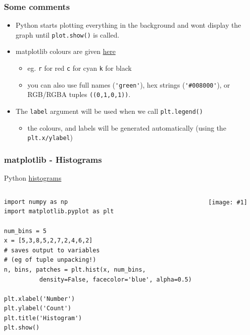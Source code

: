 \documentclass[xcolor=svgnames, handout]{beamer}
\newcommand{\nl}{\\[1em]}
\newcommand{\ipic}[2]{\texttt{[image: \#1]}}
\newcommand{\ft}[1]{\frametitle{#1}}
\begin{document}
\begin{frame}[fragile]\ft{Some comments}
\begin{itemize}
\item Python starts plotting everything in the background and wont display the graph until {\tt plot.show()} is called.\nl

\item matplotlib colours are given  \href{https://matplotlib.org/2.1.1/api/_as_gen/matplotlib.pyplot.plot.html}{here}
\vspace{-.3em}
\begin{itemize}
\item eg. {\tt r} for red {\tt c} for cyan {\tt k} for black
\item you can also use full names (\verb|'green'|), hex strings (\verb|'#008000'|), or RGB/RGBA tuples \verb|((0,1,0,1))|.\nl%
\end{itemize}
\item The {\tt label} argument will be used when we call {\tt plt.legend()}
\begin{itemize}
\item the colours, and labels will be generated automatically (using the {\tt plt.x/ylabel})
\end{itemize}

\end{itemize}

\end{frame}






\begin{frame}[fragile]\ft{matplotlib - Histograms }
Python \href{https://matplotlib.org/3.1.0/api/_as_gen/matplotlib.pyplot.hist.html}{histograms}
\begin{columns}[T] %
\begin{column}{.50\textwidth}
\begin{Verbatim}[xleftmargin=.1in] 
import numpy as np
import matplotlib.pyplot as plt

num_bins = 5
x = [5,3,8,5,2,7,2,4,6,2]
# saves output to variables
# (eg of tuple unpacking!)
n, bins, patches = plt.hist(x, num_bins, 
          density=False, facecolor='blue', alpha=0.5)

plt.xlabel('Number')
plt.ylabel('Count')
plt.title('Histogram')
plt.show()
\end{Verbatim}
\end{column}%
\hfill%
\begin{column}{.46\textwidth}
\ipic{hist}{0.9}
\end{column}%
\end{columns}
\end{frame}
\end{document}
